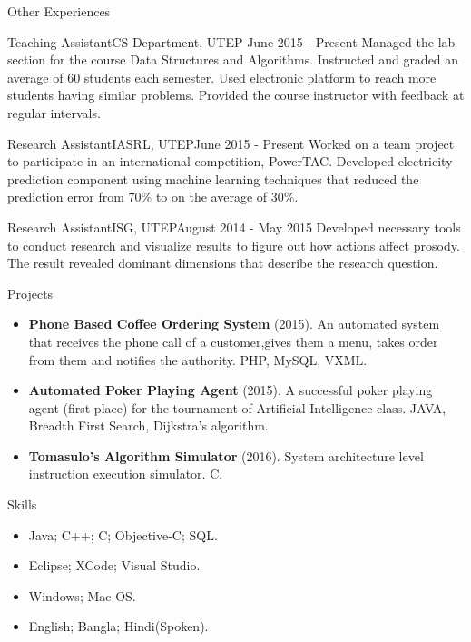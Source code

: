 \documentclass[]{mcdowellcv}
\begin{document}
	\begin{cvsection}{Other Experiences}
		\begin{cvsubsection}{Teaching Assistant}{CS Department, UTEP }{June 2015 - Present}
			Managed the lab section for the course Data Structures and Algorithms. Instructed and graded an average of 60 students each semester. Used electronic platform to reach more students having similar problems. Provided the course instructor with feedback at regular intervals. 
		\end{cvsubsection}
		\begin{cvsubsection}{Research Assistant}{IASRL, UTEP}{June 2015 - Present}
			Worked on a team project to participate in an international competition, PowerTAC. Developed electricity prediction component using machine learning techniques that reduced the prediction error from 70\% to on the average of 30\%.
		\end{cvsubsection}
		
		\begin{cvsubsection}{Research Assistant}{ISG, UTEP}{August 2014 - May 2015} 
			Developed necessary tools to conduct research and visualize results to figure out how actions affect prosody. The result revealed dominant dimensions that describe the research question.
		\end{cvsubsection}
	\end{cvsection}
	
	
	\begin{cvsection}{Projects}
		\begin{cvsubsection}{}{}{}
			\begin{itemize}
				\item \textbf{Phone Based Coffee Ordering System} (2015). An automated system that receives the phone call of a customer,gives them a menu, takes order from them and notifies the authority.  PHP, MySQL, VXML.
				\item \textbf{Automated Poker Playing Agent} (2015). A successful poker playing agent (first place) for the tournament of Artificial Intelligence class.  JAVA, Breadth First Search, Dijkstra's algorithm.
				\item \textbf{Tomasulo's Algorithm Simulator} (2016).  System architecture level instruction execution simulator. C.
			\end{itemize}
		\end{cvsubsection}
	\end{cvsection}
	
	
	\begin{cvsection}{Skills}
		\begin{cvsubsection}{}{}{}	
			\begin{itemize}
				\item Java; C++; C; Objective-C; SQL.  
				\item Eclipse; XCode; Visual Studio.
				\item Windows; Mac OS. 
				\item English; Bangla; Hindi(Spoken).
			\end{itemize}
		\end{cvsubsection}
	\end{cvsection}
	
\end{document}
